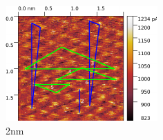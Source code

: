 \begin{figure}[H]
\centering
\includegraphics[width=\textwidth]{../Gwyddion/HOPG/2nm_gimped.pdf}
\caption{2nm}
\label{2nm}
\end{figure}
	

